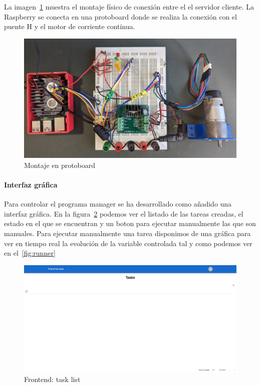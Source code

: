 La imagen~\cref{fig:montaje en protoboard} muestra el montaje físico de conexión entre el el servidor cliente. La Raspberry se conecta en una protoboard donde se realiza la conexión con el puente H y el motor de corriente continua.

\begin{figure}[H]
    \centering
    \includegraphics[height=0.2\textheight]{./part/Ejecucion/Seguimiento/PuestaAPunto/img/montajeProtoboard}
    \caption{Montaje en protoboard}\label{fig:montaje en protoboard}
\end{figure}

\paragraph{Interfaz gráfica}\label{par:interfaz}

Para controlar el programa manager se ha desarrollado como añadido una interfaz gráfica. En la figura~\cref{fig:frontend} podemos ver el listado de las tareas creadas, el estado en el que se encuentran y un boton para ejecutar manualmente las que son manuales. Para ejecutar manualmente una tarea disponimos de una gráfica para ver en tiempo real la evolución de la variable controlada tal y como podemos ver en el~\cref{fig:runner}

\begin{figure}[H]
    \centering
    \includegraphics[height=0.2\textheight]{./part/Ejecucion/Seguimiento/PuestaAPunto/img/frontend}
    \caption{Frontend: task list}\label{fig:frontend}
\end{figure}

